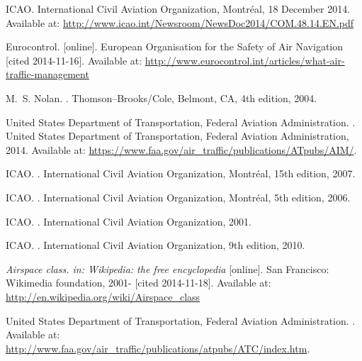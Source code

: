 \begin{thebibliography}{1}

ICAO.
\newblock International Civil Aviation Organization, Montréal, 18 December 2014.
\newblock Available at: \url{http://www.icao.int/Newsroom/NewsDoc2014/COM.48.14.EN.pdf}

Eurocontrol.
 [online].
\newblock European Organisation for the Safety of Air Navigation [cited 2014-11-16].
\newblock Available at: \url{http://www.eurocontrol.int/articles/what-air-traffic-management}

M.~S. Nolan.
.
\newblock Thomson--Brooks/Cole, Belmont, CA, 4th edition, 2004.

United States Department of Transportation, Federal Aviation Administration.
.
\newblock United States Department of Transportation, Federal Aviation Administration, 2014.
\newblock Available at: \url{https://www.faa.gov/air_traffic/publications/ATpubs/AIM/}.

ICAO.
.
\newblock International Civil Aviation Organization, Montréal, 15th edition, 2007.

ICAO.
.
\newblock International Civil Aviation Organization, Montréal, 5th edition, 2006.

ICAO.
.
\newblock International Civil Aviation Organization, 2001.

ICAO.
.
\newblock International Civil Aviation Organization, 9th edition, 2010.

{\em Airspace class. in: Wikipedia: the free encyclopedia} [online].
\newblock San Francisco: Wikimedia foundation, 2001- [cited 2014-11-18].
\newblock Available at: \url{http://en.wikipedia.org/wiki/Airspace_class}

United States Department of Transportation, Federal Aviation Administration.
.
\newblock Available at: \url{http://www.faa.gov/air_traffic/publications/atpubs/ATC/index.htm}.


\end{thebibliography}
